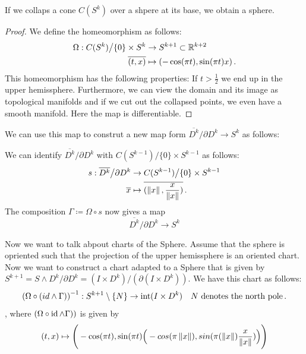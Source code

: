 \begin{corollary} \label{cor: suspension of a sphere is a sphere}
	If we collaps a cone $C(S^k)$ over a shpere at its base, we obtain a sphere. 
\end{corollary}
\begin{proof}
	We define the homeomorphism as follows:
	\begin{align*}
	\Omega:	C(S^k)\big/ \{0\}\times S^k &\to S^{k+1}\subset \mathbb{R}^{k+2}\\
		\overline{(t,x)} & \mapsto (-\cos(\pi t),\sin(\pi t)x)\,.
	\end{align*} This homeomorphism has the following properties:
If $t>\frac{1}{2}$ we end up in the upper hemissphere. Furthermore, we can view the domain and its image as topological manifolds and if we cut out the collapsed points, we even have a smooth manifold. Here the map is differentiable. 
\end{proof}
We can use this map to construt a new map form $\overline{D^k}\big/ \partial D^k \to S^k $ as follows: 
\begin{definition}\label{def: Disk modulo boundary to sphere}
We can identify $\overline{D^k}\big/ \partial D^k$ with $C(S^{k-1})\big/\{0\}\times S^{k-1} $ as follows:
\begin{align*}
s: \overline{D^k}\big/ \partial D^k & \to C(S^{k-1})\big/\{0\}\times S^{k-1} \\
\overline{x} &\mapsto \overline{(\left\lVert x\right\rVert,\frac{x}{\left\lVert x\right\rVert})}\,.
\end{align*} The composition $\Gamma \coloneq \Omega \circ s$ now gives a map 
\begin{equation*}
	\overline{D^k}\big/ \partial D^k \to  S^{k}
\end{equation*}
\end{definition}
Now we want to talk abpout charts of the Sphere. Assume that the sphere is opriented such that the projection of the upper hemissphere is an oriented chart.  Now we want to construct a chart adapted to a Sphere that is given by $S^{k+1}=S\wedge D^k\Big/ \partial D^k=\left(I\times D^k\right)\Big/\left(\partial (I\times D^k)\right)$. We have this chart as follows:
\begin{equation*}
	\left(\Omega \circ (id \wedge \Gamma )\right)^{-1}: S^{k+1}\setminus \{N\} \to \operatorname{\mathrm{int}}(I\times D^k) \quad N \text{ denotes the north pole}\,.
\end{equation*}, where $(\Omega\circ \operatorname{\mathrm{id}} \wedge \Gamma))$ is given by
\begin{equation*}
	(t,x)\mapsto \Bigg(-\cos(\pi t),\sin(\pi t)\Big( -cos(\pi \left\lVert x\right\rVert),sin(\pi(\left\lVert x\right\rVert)\frac{x}{\left\lVert x\right\rVert})\Big) \Bigg)
\end{equation*}

